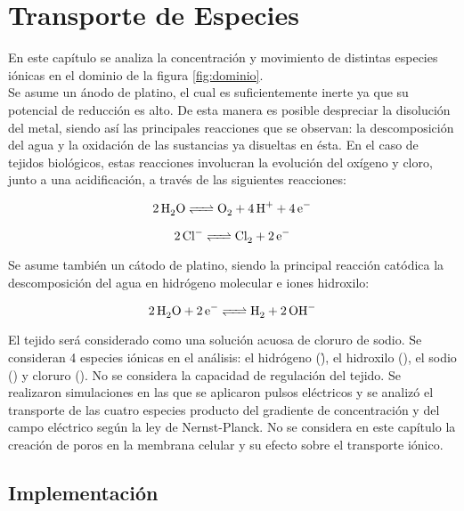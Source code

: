 \chapter{Transporte de Especies} \label{chap:trans}

En este capítulo se analiza la concentración y movimiento de distintas especies iónicas en el dominio de la figura \ref{fig:dominio}. \\

Se asume un ánodo de platino, el cual es suficientemente inerte ya que su potencial de reducción es alto. De esta manera es posible despreciar la disolución del metal, siendo así las principales reacciones que se observan: la descomposición del agua y la oxidación de las sustancias ya disueltas en ésta. En el caso de tejidos biológicos, estas reacciones involucran la evolución del oxígeno y cloro, junto a una acidificación, a través de las siguientes reacciones:


\begin{equation}
	\ce{2H_2O <=> O_2 + 4H^+ + 4e^-}
\end{equation}

\begin{equation}
	\ce{2Cl^- <=> Cl_2 + 2e^-}	
\end{equation}

Se asume también un cátodo de platino, siendo la principal reacción catódica la descomposición del agua en hidrógeno molecular e iones hidroxilo:

\begin{equation}
	\ce{2H_2O + 2e^- <=> H_2 + 2OH^-}
\end{equation}

El tejido será considerado como una solución acuosa de cloruro de sodio. Se consideran 4 especies iónicas en el análisis: el hidrógeno (\h), el hidroxilo (\oh), el sodio (\na) y cloruro (\cl). No se considera la capacidad de regulación del tejido. Se realizaron simulaciones en las que se aplicaron pulsos eléctricos y se analizó el transporte de las cuatro especies producto del gradiente de concentración y del campo eléctrico según la ley de Nernst-Planck. No se considera en este capítulo la creación de poros en la membrana celular y su efecto sobre el transporte iónico.

\section{Implementación}


